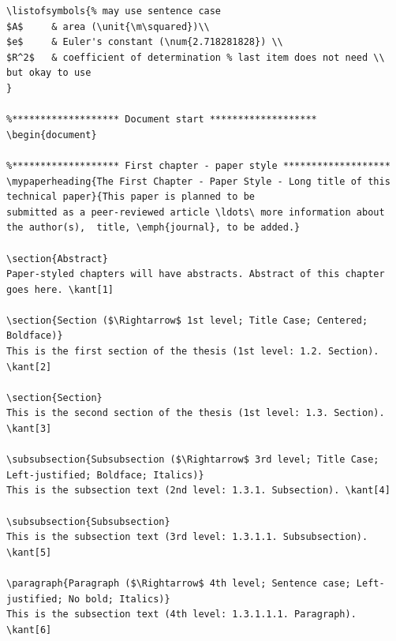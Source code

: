 \documentclass{article}
\begin{document}
{\begin{verbatim}
\listofsymbols{% may use sentence case
$A$     & area (\unit{\m\squared})\\
$e$     & Euler's constant (\num{2.718281828}) \\
$R^2$   & coefficient of determination % last item does not need \\  but okay to use
}

%******************* Document start *******************
\begin{document}

%******************* First chapter - paper style *******************
\mypaperheading{The First Chapter - Paper Style - Long title of this technical paper}{This paper is planned to be 
submitted as a peer-reviewed article \ldots\ more information about the author(s),  title, \emph{journal}, to be added.}

\section{Abstract}
Paper-styled chapters will have abstracts. Abstract of this chapter goes here. \kant[1]

\section{Section ($\Rightarrow$ 1st level; Title Case; Centered; Boldface)}
This is the first section of the thesis (1st level: 1.2. Section). \kant[2]

\section{Section}
This is the second section of the thesis (1st level: 1.3. Section). \kant[3]

\subsubsection{Subsubsection ($\Rightarrow$ 3rd level; Title Case; Left-justified; Boldface; Italics)}
This is the subsection text (2nd level: 1.3.1. Subsection). \kant[4]

\subsubsection{Subsubsection}
This is the subsection text (3rd level: 1.3.1.1. Subsubsection). \kant[5]

\paragraph{Paragraph ($\Rightarrow$ 4th level; Sentence case; Left-justified; No bold; Italics)}
This is the subsection text (4th level: 1.3.1.1.1. Paragraph). \kant[6]


\end{verbatim}}
\end{document}
